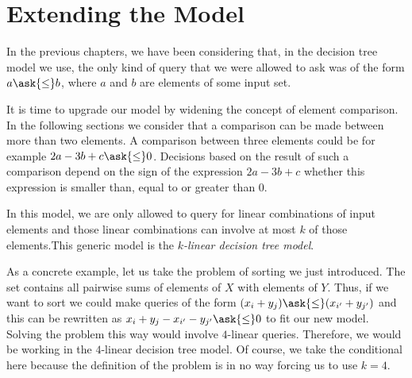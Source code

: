 \section{Extending the Model}

In the previous chapters, we have been considering that, in the decision tree
model we use, the only kind of query that we were allowed to ask was of the
form \(a \ask{\le} b \), where \(a\) and \(b\) are elements of some input set.

It is time to upgrade our model by widening the concept of element
comparison. In the following sections we consider that a comparison can be made
between more than two elements. A comparison between three elements could be
for example \(2a - 3b + c \ask{\le} 0\). Decisions based on the result of such
a comparison depend on the sign of the expression \(2a - 3b + c\) \ie whether
this expression is smaller than, equal to or greater than \(0\).

In this model, we are only allowed to query for linear combinations of
input elements and those linear combinations can involve at most \(k\) of those
elements.This generic model is the \emph{\(k\)-linear decision tree
model}.

As a concrete example, let us take the problem of sorting \XY we just introduced.
The set \XY contains all pairwise sums of elements of \(X\) with elements of
\(Y\). Thus, if we want to sort \XY we could make queries of the form \((x_i +
y_j) \ask{\le} (x_{i'} + y_{j'})\) and this can be rewritten as \( x_i +
y_j - x_{i'} - y_{j'} \ask{\le} 0\) to fit our new model. Solving the problem
this way would involve \(4\)-linear queries. Therefore, we would be working in
the \(4\)-linear decision tree model. Of course, we take the conditional here
because the definition of the problem is in no way forcing us to use \(k=4\).
